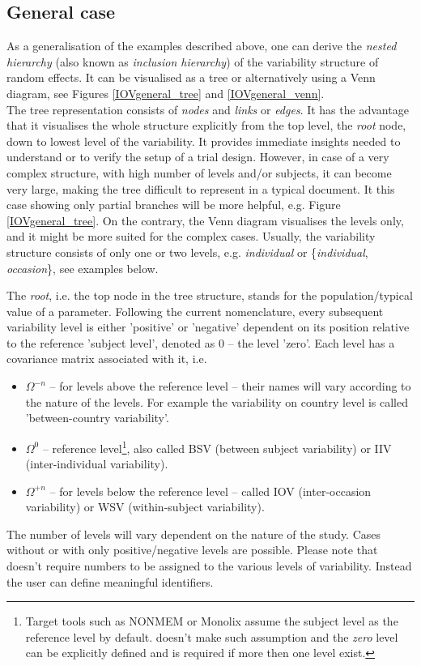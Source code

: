 \subsection{General case}
As a generalisation of the examples described above, one can derive the 
\textit{nested hierarchy} (also known as \textit{inclusion hierarchy}) of the variability 
structure of random effects. It can be visualised as a tree or alternatively using 
a Venn diagram, see Figures \ref{IOVgeneral_tree} and \ref{IOVgeneral_venn}. \\
The tree representation consists of \textit{nodes} and \textit{links} or \textit{edges}. 
It has the advantage that it visualises the whole structure explicitly from the top 
level, the \textit{root} node, down to lowest level of the variability. It provides 
immediate insights needed to understand or to verify the setup of a trial design. 
However, in case of a very complex structure, with high number of levels and/or 
subjects, it can become very large, making the tree difficult to represent in a typical 
document. It this case showing only partial branches will be more helpful, 
e.g. Figure \ref{IOVgeneral_tree}. On the contrary, the Venn diagram visualises 
the levels only, and it might be more suited for the complex cases. Usually, the 
variability structure consists of only one or two levels, e.g. \textit{individual} or 
\{\textit{individual}, \textit{occasion}\}, see examples below. 


The \textit{root}, i.e. the top node in the tree structure, stands for the population/typical 
value of a parameter. Following the current nomenclature, every subsequent variability 
level is either 'positive' or 'negative' dependent on its position relative to the reference 
'subject level', denoted as 0 -- the level 'zero'. Each level has a covariance matrix 
associated with it, i.e. 
\begin{itemize}
\item 
$\Omega^{-n}$ -- for levels above the reference level -- their names will vary according to 
the nature of the levels. For example the variability on country level is called 
'between-country variability'.
\item 
$\Omega^0$ -- reference level\footnote{Target tools such as NONMEM or Monolix assume 
the subject level as the reference level by default. \pml doesn't make such assumption and 
the \emph{zero} level can be explicitly defined and is required if more then one level exist.}, 
also called BSV (between subject variability) or IIV (inter-individual variability).
\item 
$\Omega^{+n}$ -- for levels below the reference level -- called  IOV (inter-occasion variability) or
WSV (within-subject variability).
\end{itemize}
The number of levels will vary dependent on the nature of the study. Cases without or 
with only positive/negative levels are possible. Please note that \pharmml doesn't require 
numbers to be assigned to the various levels of variability. Instead the user can 
define meaningful identifiers.

